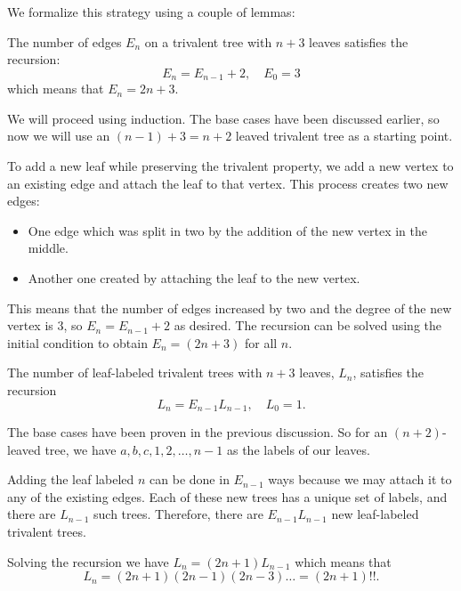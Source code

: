 \documentclass[12pt]{memoir}
\begin{document}
    We formalize this strategy using a couple of lemmas:
    
    \begin{Lem}
    The number of edges $E_n$ on a trivalent tree with $n+3$ leaves satisfies the recursion:
    $$E_n=E_{n-1}+2,\quad E_0=3$$
    which means that $E_n=2n+3$.
    \end{Lem}
    
    \begin{ptcbp}
        We will proceed using induction. The base cases have been discussed earlier, so now we will use an $(n-1)+3=n+2$ leaved trivalent tree as a starting point.\par 
    To add a new leaf while preserving the trivalent property, we add a new vertex to an existing edge and attach the leaf to that vertex. This process creates two new edges: 
    \begin{itemize}
        \item One edge which was split in two by the addition of the new vertex in the middle.
        \item Another one created by attaching the leaf to the new vertex.
    \end{itemize}
      This means that the number of edges increased by two and the degree of the new vertex is $3$, so $E_n=E_{n-1}+2$ as desired. The recursion can be solved using the initial condition to obtain $E_n=(2n+3)$ for all $n$.
    \end{ptcbp}
    
    \begin{Lem}
    The number of leaf-labeled trivalent trees with $n+3$ leaves, $L_n$, satisfies the recursion 
    $$L_{n}=E_{n-1}L_{n-1},\quad L_0=1.$$ 
    \end{Lem}
    
    \begin{ptcbp}
        The base cases have been proven in the previous discussion. So for an $(n+2)$-leaved tree, we have ${a,b,c,1,2,\dots,n-1}$ as the labels of our leaves.\par 
        Adding the leaf labeled $n$ can be done in $E_{n-1}$ ways because we may attach it to any of the existing edges. Each of these new trees has a unique set of labels, and there are $L_{n-1}$ such trees. Therefore, there are $E_{n-1}L_{n-1}$ new leaf-labeled trivalent trees.\par 
        Solving the recursion we have $L_n=(2n+1)L_{n-1}$ which means that 
        $$L_n=(2n+1)(2n-1)(2n-3)\dots=(2n+1)!!.$$
    \end{ptcbp}
    
\end{document}
